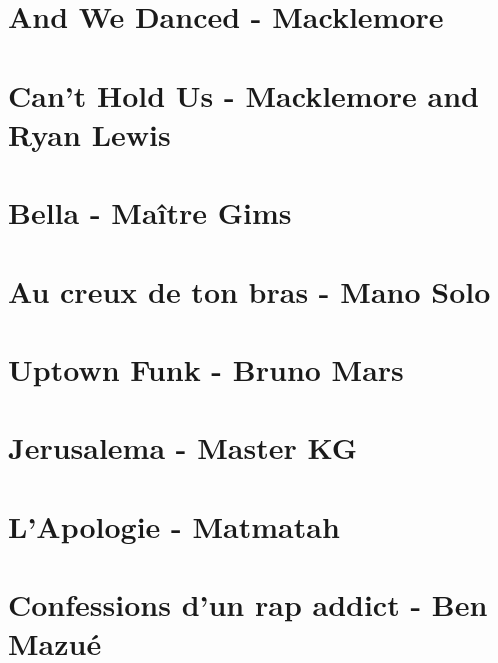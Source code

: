 \documentclass[11pt]{article}
\begin{document}
\section{And We Danced - Macklemore}
\begin{guitar}

\end{guitar}

\section{Can't Hold Us - Macklemore and Ryan Lewis}
\begin{guitar}

\end{guitar}

\section{Bella - Maître Gims}
\begin{guitar}

\end{guitar}


\section{Au creux de ton bras - Mano Solo}
\begin{guitar}

\end{guitar}

\section{Uptown Funk - Bruno Mars}


\section{Jerusalema - Master KG}


\section{L'Apologie - Matmatah}


\section{Confessions d'un rap addict - Ben Mazué}
\begin{guitar}

\end{guitar}
\end{document}

